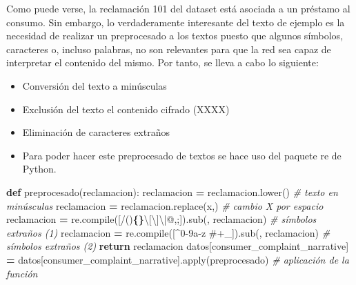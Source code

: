 \documentclass[
  a4paper,
  DIV=11,
  numbers=noendperiod]{scrreprt}
\newenvironment{Shaded}{\begin{snugshade}}{\end{snugshade}}
\newcommand{\BuiltInTok}[1]{#1}
\newcommand{\CommentTok}[1]{\textcolor[rgb]{0.56,0.35,0.01}{\textit{#1}}}
\newcommand{\ControlFlowTok}[1]{\textcolor[rgb]{0.13,0.29,0.53}{\textbf{#1}}}
\newcommand{\KeywordTok}[1]{\textcolor[rgb]{0.13,0.29,0.53}{\textbf{#1}}}
\newcommand{\NormalTok}[1]{#1}
\newcommand{\OperatorTok}[1]{\textcolor[rgb]{0.81,0.36,0.00}{\textbf{#1}}}
\newcommand{\SpecialCharTok}[1]{\textcolor[rgb]{0.81,0.36,0.00}{\textbf{#1}}}
\newcommand{\StringTok}[1]{\textcolor[rgb]{0.31,0.60,0.02}{#1}}
\providecommand{\tightlist}{%
  \setlength{\itemsep}{0pt}\setlength{\parskip}{0pt}}\usepackage{longtable,booktabs,array}
\begin{document}
Como puede verse, la reclamación 101 del dataset está asociada a un
préstamo al consumo. Sin embargo, lo verdaderamente interesante del
texto de ejemplo es la necesidad de realizar un preprocesado a los
textos puesto que algunos símbolos, caracteres o, incluso palabras, no
son relevantes para que la red sea capaz de interpretar el contenido del
mismo. Por tanto, se lleva a cabo lo siguiente:

\begin{itemize}
\tightlist
\item
  Conversión del texto a minúsculas
\item
  Exclusión del texto el contenido cifrado (XXXX)
\item
  Eliminación de caracteres extraños
\item
  Para poder hacer este preprocesado de textos se hace uso del paquete
  re de Python.
\end{itemize}

\begin{Shaded}
\begin{Highlighting}[numbers=left,,]
\KeywordTok{def}\NormalTok{ preprocesado(reclamacion):}
\NormalTok{    reclamacion }\OperatorTok{=}\NormalTok{ reclamacion.lower() }\CommentTok{\# texto en minúsculas}
\NormalTok{    reclamacion }\OperatorTok{=}\NormalTok{ reclamacion.replace(}\StringTok{\textquotesingle{}x\textquotesingle{}}\NormalTok{,}\StringTok{\textquotesingle{}\textquotesingle{}}\NormalTok{) }\CommentTok{\# cambio X por espacio}
\NormalTok{    reclamacion }\OperatorTok{=}\NormalTok{ re.}\BuiltInTok{compile}\NormalTok{(}\StringTok{\textquotesingle{}[/()}\SpecialCharTok{\{\}}\StringTok{\textbackslash{}[\textbackslash{}]\textbackslash{}|@,;]\textquotesingle{}}\NormalTok{).sub(}\StringTok{\textquotesingle{}\textquotesingle{}}\NormalTok{, reclamacion) }\CommentTok{\# símbolos extraños (1)}
\NormalTok{    reclamacion }\OperatorTok{=}\NormalTok{ re.}\BuiltInTok{compile}\NormalTok{(}\StringTok{\textquotesingle{}[\^{}0{-}9a{-}z \#+\_]\textquotesingle{}}\NormalTok{).sub(}\StringTok{\textquotesingle{}\textquotesingle{}}\NormalTok{, reclamacion) }\CommentTok{\# símbolos extraños (2)}
    \ControlFlowTok{return}\NormalTok{ reclamacion}
\NormalTok{datos[}\StringTok{\textquotesingle{}consumer\_complaint\_narrative\textquotesingle{}}\NormalTok{] }\OperatorTok{=}\NormalTok{ datos[}\StringTok{\textquotesingle{}consumer\_complaint\_narrative\textquotesingle{}}\NormalTok{].}\BuiltInTok{apply}\NormalTok{(preprocesado) }\CommentTok{\# aplicación de la función}
\end{Highlighting}
\end{Shaded}
\end{document}
